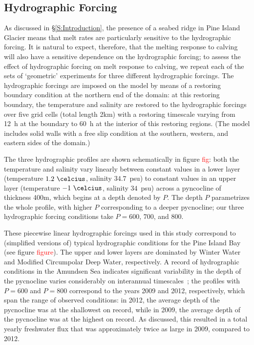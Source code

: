 \documentclass[draft]{agujournal2019}
\newcommand{\red}[1]{\textcolor{red}{#1}}
\begin{document}
\subsection{Hydrographic Forcing}\label{S:Experiment:Hydrography}

As discussed in \S\ref{S:Introduction}, the presence of a seabed ridge in Pine Island Glacier means that melt rates are particularly sensitive to the hydrographic forcing. It is natural to expect, therefore, that the melting response to calving will also have a sensitive dependence on the hydrographic forcing; to assess the effect of hydrographic forcing on melt response to calving, we repeat each of the sets of `geometric' experiments for three different hydrographic forcings. The hydrographic forcings are imposed on the model by means of a restoring boundary condition at the northern end of the domain: at this restoring boundary, the temperature and salinity are restored to the hydrographic forcings over five grid cells (total length 2km) with a restoring timescale varying from 12~h at the boundary to 60~h at the interior of this restoring regions. (The model includes solid walls with a free slip condition at the southern, western, and eastern sides of the domain.)

The three hydrographic profiles are shown schematically in figure \red{fig}: both the temperature and salinity vary linearly between constant values in a lower layer (temperature $1.2~\si{\celcius}$, salinity $34.7$~psu) to constant values in an upper layer (temperature $-1~\si{\celcius}$, salinity $34$~psu) across a pyncocline of thickness 400m, which begins at a depth denoted by $P$. The depth $P$ parametrizes the whole profile, with higher $P$ corresponding to a deeper pycnocline; our three hydrographic forcing conditions take $P = 600$, $700$, and $800$. 

These piecewise linear hydrographic forcings used in this study correspond to (simplified versions of) typical hydrographic conditions for the Pine Island Bay~\cite{Jacobs1996GRL, Dutrieux2014Science, Jenkins2018NatureGeo} (see figure \red{figure}). The upper and lower layers are dominated by Winter Water and Modified Circumpolar Deep Water, respectively. A record of hydrographic conditions in the Amundsen Sea indicates significant variability in the depth of the pycnocline varies considerably on interannual timescales~\cite{Dutrieux2014Science}; the profiles with $P = 600$ and $P = 800$ correspond to the years 2009 and 2012, respectively, which span the range of observed conditions: in 2012, the average depth of the pycnocline was at the shallowest on record, while in 2009, the average depth of the pycnocline was at the highest on record. As discussed, this resulted in a total yearly freshwater flux that was approximately twice as large in 2009, compared to 2012.
\end{document}
